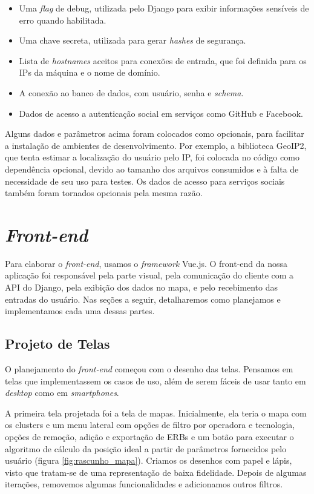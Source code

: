 \documentclass[]{politex}
\begin{document}
\begin{itemize}
\item Uma \textit{flag} de debug, utilizada pelo Django para exibir informações
sensíveis de erro quando habilitada.
\item Uma chave secreta, utilizada para gerar \textit{hashes} de segurança.
\item Lista de \textit{hostnames} aceitos para conexões de entrada, que foi
definida para os IPs da máquina e o nome de domínio.
\item A conexão ao banco de dados, com usuário, senha e \textit{schema}.
\item Dados de acesso a autenticação social em serviços como GitHub e Facebook.
\end{itemize}

Alguns dados e parâmetros acima foram colocados como opcionais, para facilitar a
instalação de ambientes de desenvolvimento. Por exemplo, a biblioteca GeoIP2,
que tenta estimar a localização do usuário pelo IP, foi colocada no código como
dependência opcional, devido ao tamanho dos arquivos consumidos e à falta de
necessidade de seu uso para testes. Os dados de acesso para serviços sociais
também foram tornados opcionais pela mesma razão.

\section{\textit{Front-end}}

Para elaborar o \textit{front-end}, usamos o \textit{framework} Vue.js. O
front-end da nossa aplicação foi responsável pela parte visual, pela comunicação
do cliente com a API do Django, pela exibição dos dados no mapa, e pelo
recebimento das entradas do usuário. Nas seções a seguir, detalharemos como
planejamos e implementamos cada uma dessas partes.

\subsection{Projeto de Telas}

O planejamento do \textit{front-end} começou com o desenho das telas. Pensamos
em telas que implementassem os casos de uso, além de serem fáceis de usar tanto
em \textit{desktop} como em \textit{smartphones}.

A primeira tela projetada foi a tela de mapas. Inicialmente, ela teria o mapa
com os clusters e um menu lateral com opções de filtro por operadora e
tecnologia, opções de remoção, adição e exportação de ERBs e um botão para
executar o algoritmo de cálculo da posição ideal a partir de parâmetros
fornecidos pelo usuário (figura \ref{fig:rascunho_mapa}). Criamos os desenhos
com papel e lápis, visto que tratam-se de uma representação de baixa fidelidade.
Depois de algumas iterações, removemos algumas funcionalidades e adicionamos
outros filtros.
\end{document}
